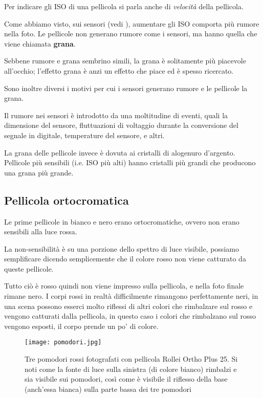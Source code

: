Per indicare gli ISO di una pellicola si parla anche di \textit{velocità} della pellicola.

Come abbiamo visto, sui sensori (vedi ), aumentare gli ISO comporta più rumore nella foto.
Le pellicole non generano rumore come i sensori, ma hanno quella che viene chiamata \textbf{grana}.

Sebbene rumore e grana sembrino simili, la grana è solitamente più piacevole all'occhio; l'effetto grana è anzi un effetto che piace ed è spesso ricercato.

Sono inoltre diversi i motivi per cui i sensori generano rumore e le pellicole la grana.

Il rumore nei sensori è introdotto da una moltitudine di eventi, quali la dimensione del sensore, fluttuazioni di voltaggio durante la conversione del segnale in digitale, temperature del sensore, e altri.

La grana delle pellicole invece è dovuta ai cristalli di alogenuro d'argento. Pellicole più sensibili (i.e. ISO più alti) hanno cristalli più grandi che producono una grana più grande.


\subsection{Pellicola ortocromatica} \label{subsec:pellicolaorto}
Le prime pellicole in bianco e nero erano ortocromatiche, ovvero non erano sensibili alla luce rossa.

La non-sensibilità è su una porzione dello spettro di luce visibile, possiamo semplificare dicendo semplicemente che il colore rosso non viene catturato da queste pellicole.

Tutto ciò è rosso quindi non viene impresso sulla pellicola, e nella foto finale rimane nero.
I corpi rossi in realtà difficilmente rimangono perfettamente neri, in una scena possono esserci molto riflessi di altri colori che rimbalzare sul rosso e vengono catturati dalla pellicola, in questo caso i colori che rimbalzano sul rosso vengono esposti, il corpo prende un po' di colore.

\begin{figure}[h]
    \centering
    \texttt{[image: pomodori.jpg]}
    \caption{
        Tre pomodori rossi fotografati con pellicola Rollei Ortho Plus 25. Si noti come la fonte di luce sulla sinistra (di colore bianco) rimbalzi e sia visibile sui pomodori, così come è visibile il riflesso della base (anch'essa bianca) sulla parte bassa dei tre pomodori
    }
\end{figure}

